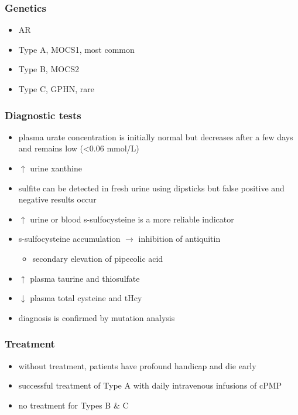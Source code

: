 \documentclass{scrartcl}
\begin{document}
\subsubsection{Genetics}
\label{sec:orge704c75}
\begin{itemize}
\item AR
\item Type A, MOCS1, most common
\item Type B, MOCS2
\item Type C, GPHN, rare
\end{itemize}

\subsubsection{Diagnostic tests}
\label{sec:org9c73466}
\begin{itemize}
\item plasma urate concentration is initially normal but decreases after a
few days and remains low (<0.06 mmol/L)
\item \(\uparrow\) urine xanthine
\item sulfite can be detected in fresh urine using dipsticks but false
positive and negative results occur
\item \(\uparrow\) urine or blood s-sulfocysteine is a more reliable indicator
\item s-sulfocysteine accumulation \(\to\) inhibition of antiquitin
\begin{itemize}
\item secondary elevation of pipecolic acid
\end{itemize}
\item \(\uparrow\) plasma taurine and thiosulfate
\item \(\downarrow\) plasma total cysteine and tHcy
\item diagnosis is confirmed by mutation analysis
\end{itemize}

\subsubsection{Treatment}
\label{sec:org15d9f5b}
\begin{itemize}
\item without treatment, patients have profound handicap and die early
\item successful treatment of Type A with daily intravenous infusions of
cPMP
\item no treatment for Types B \& C
\end{itemize}
\end{document}
